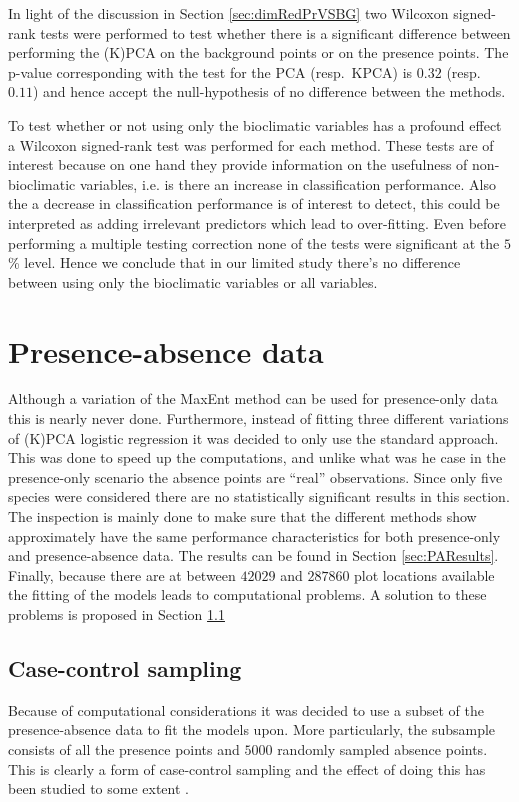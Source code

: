 In light of the discussion in Section \ref{sec:dimRedPrVSBG} two Wilcoxon signed-rank tests were performed to test whether there is a significant difference between performing the (K)PCA on the background points or on the presence points. The p-value corresponding with the test for the PCA (resp.\ KPCA) is $0.32$ (resp.\ $0.11$) and hence accept the null-hypothesis of no difference between the methods.

To test whether or not using only the bioclimatic variables has a profound effect a Wilcoxon signed-rank test was performed for each method. These tests are of interest because on one hand they provide information on the usefulness of non-bioclimatic variables, i.e. is there an increase in classification performance. Also the a decrease in classification performance is of interest to detect, this could be interpreted as adding irrelevant predictors which lead to over-fitting. Even before performing a multiple testing correction none of the tests were significant at the $5$\% level. Hence we conclude that in our limited study there's no difference between using only the bioclimatic variables or all variables. 

\section{Presence-absence data}
Although a variation of the MaxEnt method can be used for presence-only data this is nearly never done. Furthermore, instead of fitting three different variations of (K)PCA logistic regression it was decided to only use the standard approach. This was done to speed up the computations, and unlike what was he case in the presence-only scenario the absence points are ``real'' observations. Since only five species were considered there are no statistically significant results in this section. The inspection is mainly done to make sure that the different methods show approximately have the same performance characteristics for both presence-only and presence-absence data. The results can be found in Section \ref{sec:PAResults}. Finally, because there are at between $42029$ and $287860$ plot locations available the fitting of the models leads to computational problems. A solution to these problems is proposed in Section \ref{sec:CaseControlSubsampling}
\subsection{Case-control sampling}
\label{sec:CaseControlSubsampling}
Because of computational considerations it was decided to use a subset of the presence-absence data to fit the models upon. More particularly, the subsample consists of all the presence points and $5000$ randomly sampled absence points. This is clearly a form of case-control sampling and the effect of doing this has been studied to some extent \parencite{king_logistic_2001}. \\


